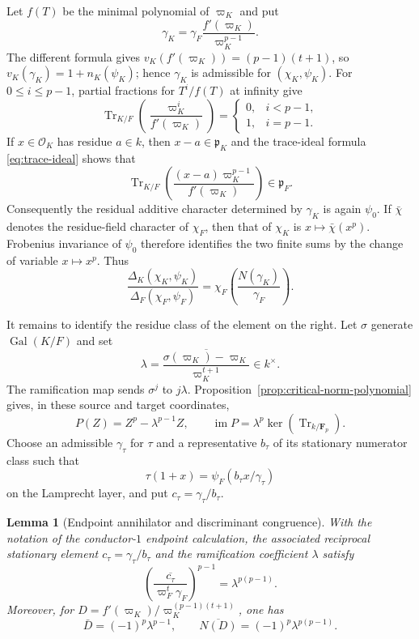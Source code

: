 \documentclass[11pt]{amsart}
\newtheorem{lemma}[theorem]{Lemma}
\theoremstyle{definition}
\theoremstyle{remark}
\newcommand{\F}{\mathbf F}
\newcommand{\cO}{\mathcal O}
\newcommand{\p}{\mathfrak p}
\newcommand{\Tr}{\operatorname{Tr}}
\newcommand{\Gal}{\operatorname{Gal}}
\begin{document}
Let $f(T)$ be the minimal polynomial of $\varpi_K$ and put
\begin{equation}\label{eq:endpoint-gamma-K}
 \gamma_K=\gamma_F\frac{f'(\varpi_K)}{\varpi_K^{p-1}}.
\end{equation}
The different formula gives
$v_K(f'(\varpi_K))=(p-1)(t+1)$, so
$v_K(\gamma_K)=1+n_K(\psi_K)$; hence $\gamma_K$ is admissible for
$(\chi_K,\psi_K)$.  For $0\le i\le p-1$, partial fractions for
$T^i/f(T)$ at infinity give
\begin{equation}\label{eq:endpoint-lagrange-trace}
 \Tr_{K/F}\!\left(\frac{\varpi_K^i}{f'(\varpi_K)}\right)
 =\begin{cases}0,&i<p-1,\\1,&i=p-1.\end{cases}
\end{equation}
If $x\in\cO_K$ has residue $a\in k$, then
$x-a\in\p_K$ and the trace-ideal formula \eqref{eq:trace-ideal}
shows that
\[
 \Tr_{K/F}\!\left(\frac{(x-a)\varpi_K^{p-1}}
                         {f'(\varpi_K)}\right)\in\p_F.
\]
Consequently the residual additive character determined by
$\gamma_K$ is again $\psi_0$.  If $\bar\chi$ denotes the residue-field
character of $\chi_F$, then that of $\chi_K$ is
$x\mapsto\bar\chi(x^p)$.  Frobenius invariance of $\psi_0$ therefore
identifies the two finite sums by the change of variable $x\mapsto x^p$.
Thus
\begin{equation}\label{eq:endpoint-upper-ratio}
 \frac{\Delta_K(\chi_K,\psi_K)}
      {\Delta_F(\chi_F,\psi_F)}
 =\chi_F\!\left(\frac{N(\gamma_K)}{\gamma_F}\right).
\end{equation}

It remains to identify the residue class of the element on the right.
Let $\sigma$ generate $\Gal(K/F)$ and set
\[
 \lambda=
 \overline{\frac{\sigma(\varpi_K)-\varpi_K}
                   {\varpi_K^{t+1}}}\in k^\times.
\]
The ramification map sends $\sigma^j$ to $j\lambda$.  Proposition~\ref{prop:critical-norm-polynomial} gives, in these
source and target coordinates,
\begin{equation}\label{eq:endpoint-critical-norm}
 P(Z)=Z^p-\lambda^{p-1}Z,
 \qquad
 \operatorname{im}P=\lambda^p\ker(\Tr_{k/\F_p}).
\end{equation}
Choose an admissible
$\gamma_\tau$ for $\tau$ and a representative $b_\tau$ of its
stationary numerator class such that
\[
 \tau(1+x)=\psi_F(b_\tau x/\gamma_\tau)
\]
on the Lamprecht layer, and put $c_\tau=\gamma_\tau/b_\tau$.
\begin{lemma}[Endpoint annihilator and discriminant congruence]
\label{lem:endpoint-discriminant-congruence}
With the notation of the conductor-$1$ endpoint calculation, the
associated reciprocal stationary element
$c_\tau=\gamma_\tau/b_\tau$ and the ramification coefficient $\lambda$
satisfy
\begin{equation}\label{eq:endpoint-c-tau}
 \left(\overline{\frac{c_\tau}{\varpi_F^t\gamma_F}}\right)^{p-1}
 =\lambda^{p(p-1)}.
\end{equation}
Moreover, for
$D=f'(\varpi_K)/\varpi_K^{(p-1)(t+1)}$, one has
\[
 \bar D=(-1)^p\lambda^{p-1},\qquad
 \overline{N(D)}=(-1)^p\lambda^{p(p-1)}.
\]
\end{lemma}
\end{document}
